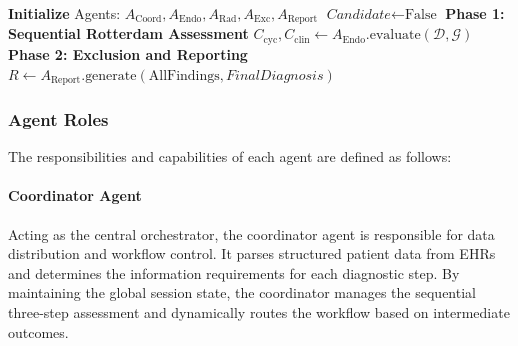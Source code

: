\documentclass[a4paper,fleqn]{cas-dc}
\begin{document}
\begin{algorithm}[htbp!]
\caption{Multi-Agent PCOS Diagnostic Workflow}
\label{alg:workflow}
\textbf{Initialize} Agents: $A_{\text{Coord}}, A_{\text{Endo}}, A_{\text{Rad}}, A_{\text{Exc}}, A_{\text{Report}}$\;
$\textit{Candidate} \leftarrow \text{False}$
\BlankLine
\textbf{Phase 1: Sequential Rotterdam Assessment}\;
$C_{\text{cyc}}, C_{\text{clin}} \leftarrow A_{\text{Endo}}.\text{evaluate}(\mathcal{D}, \mathcal{G})$\;
\BlankLine
\textbf{Phase 2: Exclusion and Reporting}\;
$R \leftarrow A_{\text{Report}}.\text{generate}(\text{AllFindings}, \textit{FinalDiagnosis})$\;
\end{algorithm}

\subsubsection{Agent Roles}
The responsibilities and capabilities of each agent are defined as follows:

\paragraph{Coordinator Agent} Acting as the central orchestrator, the coordinator agent is responsible for data distribution and workflow control. It parses structured patient data from EHRs and determines the information requirements for each diagnostic step. By maintaining the global session state, the coordinator manages the sequential three-step assessment and dynamically routes the workflow based on intermediate outcomes.
\end{document}
